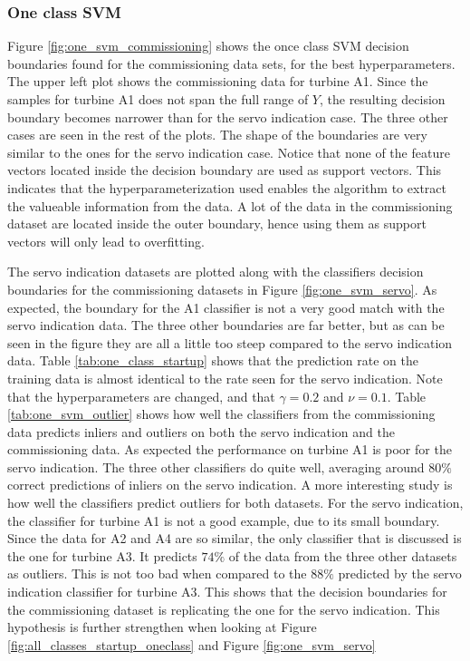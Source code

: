         \subsubsection{One class SVM}
            Figure \ref{fig:one_svm_commissioning} shows the once class SVM decision boundaries found for the commissioning data sets, for the best hyperparameters. The upper left plot shows the commissioning data for turbine A1. Since the samples for turbine A1 does not span the full range of $Y$, the resulting decision boundary becomes narrower than for the servo indication case. The three other cases are seen in the rest of the plots. The shape of the boundaries are very similar to the ones for the servo indication case. Notice that none of the feature vectors located inside the decision boundary are used as support vectors. This indicates that the hyperparameterization used enables the algorithm to extract the valueable information from the data. A lot of the data in the commissioning dataset are located inside the outer boundary, hence using them as support vectors will only lead to overfitting.
            
            The servo indication datasets are plotted along with the classifiers decision boundaries for the commissioning datasets in Figure \ref{fig:one_svm_servo}. As expected, the boundary for the A1 classifier is not a very good match with the servo indication data. The three other boundaries are far better, but as can be seen in the figure they are all a little too steep compared to the servo indication data. Table \ref{tab:one_class_startup} shows that the prediction rate on the training data is almost identical to the rate seen for the servo indication. Note that the hyperparameters are changed, and that $\gamma = 0.2$ and $\nu = 0.1$. Table \ref{tab:one_svm_outlier} shows how well the classifiers from the commissioning data predicts inliers and outliers on both the servo indication and the commissioning data. As expected the performance on turbine A1 is poor for the servo indication. The three other classifiers do quite well, averaging around $80\%$ correct predictions of inliers on the servo indication. A more interesting study is how well the classifiers predict outliers for both datasets. For the servo indication, the classifier for turbine A1 is not a good example, due to its small boundary. Since the data for A2 and A4 are so similar, the only classifier that is discussed is the one for turbine A3. It predicts $74\%$ of the data from the three other datasets as outliers. This is not too bad when compared to the $88\%$ predicted by the servo indication classifier for turbine A3. This shows that the decision boundaries for the commissioning dataset is replicating the one for the servo indication. This hypothesis is further strengthen when looking at Figure \ref{fig:all_classes_startup_oneclass} and Figure \ref{fig:one_svm_servo}
            
